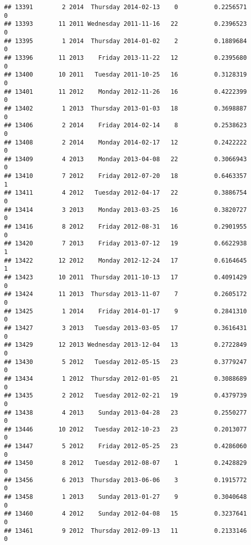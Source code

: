 \documentclass[
]{article}
\begin{document}
\begin{verbatim}
## 13391        2 2014  Thursday 2014-02-13    0          0.2256571             0
## 13393       11 2011 Wednesday 2011-11-16   22          0.2396523             0
## 13395        1 2014  Thursday 2014-01-02    2          0.1889684             0
## 13396       11 2013    Friday 2013-11-22   12          0.2395680             0
## 13400       10 2011   Tuesday 2011-10-25   16          0.3128319             0
## 13401       11 2012    Monday 2012-11-26   16          0.4222399             0
## 13402        1 2013  Thursday 2013-01-03   18          0.3698887             0
## 13406        2 2014    Friday 2014-02-14    8          0.2538623             0
## 13408        2 2014    Monday 2014-02-17   12          0.2422222             0
## 13409        4 2013    Monday 2013-04-08   22          0.3066943             0
## 13410        7 2012    Friday 2012-07-20   18          0.6463357             1
## 13411        4 2012   Tuesday 2012-04-17   22          0.3886754             0
## 13414        3 2013    Monday 2013-03-25   16          0.3820727             0
## 13416        8 2012    Friday 2012-08-31   16          0.2901955             0
## 13420        7 2013    Friday 2013-07-12   19          0.6622938             1
## 13422       12 2012    Monday 2012-12-24   17          0.6164645             1
## 13423       10 2011  Thursday 2011-10-13   17          0.4091429             0
## 13424       11 2013  Thursday 2013-11-07    7          0.2605172             0
## 13425        1 2014    Friday 2014-01-17    9          0.2841310             0
## 13427        3 2013   Tuesday 2013-03-05   17          0.3616431             0
## 13429       12 2013 Wednesday 2013-12-04   13          0.2722849             0
## 13430        5 2012   Tuesday 2012-05-15   23          0.3779247             0
## 13434        1 2012  Thursday 2012-01-05   21          0.3088689             0
## 13435        2 2012   Tuesday 2012-02-21   19          0.4379739             0
## 13438        4 2013    Sunday 2013-04-28   23          0.2550277             0
## 13446       10 2012   Tuesday 2012-10-23   23          0.2013077             0
## 13447        5 2012    Friday 2012-05-25   23          0.4286060             0
## 13450        8 2012   Tuesday 2012-08-07    1          0.2428829             0
## 13456        6 2013  Thursday 2013-06-06    3          0.1915772             0
## 13458        1 2013    Sunday 2013-01-27    9          0.3040648             0
## 13460        4 2012    Sunday 2012-04-08   15          0.3237641             0
## 13461        9 2012  Thursday 2012-09-13   11          0.2133146             0

\end{verbatim}
\end{document}
